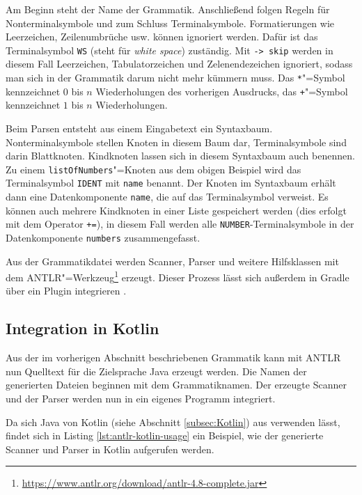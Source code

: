 Am Beginn steht der Name der Grammatik. Anschließend folgen Regeln für Nonterminalsymbole und zum Schluss Terminalsymbole. Formatierungen wie Leerzeichen, Zeilenumbrüche usw. können ignoriert werden. Dafür ist das Terminalsymbol \lstinline{WS} (steht für \emph{white space}) zuständig. Mit \lstinline{-> skip} werden in diesem Fall Leerzeichen, Tabulatorzeichen und Zelenendezeichen ignoriert, sodass man sich in der Grammatik darum nicht mehr kümmern muss. Das \lstinline{*}"=Symbol kennzeichnet $0$ bis $n$ Wiederholungen des vorherigen Ausdrucks, das \lstinline{+}"=Symbol kennzeichnet $1$ bis $n$ Wiederholungen.

Beim Parsen entsteht aus einem Eingabetext ein Syntaxbaum. Nonterminalsymbole stellen Knoten in diesem Baum dar, Terminalsymbole sind darin Blattknoten. Kindknoten lassen sich in diesem Syntaxbaum auch benennen. Zu einem \lstinline{listOfNumbers}"=Knoten aus dem obigen Beispiel wird das Terminalsymbol \lstinline{IDENT} mit \lstinline{name} benannt. Der Knoten im Syntaxbaum erhält dann eine Datenkomponente \lstinline{name}, die auf das Terminalsymbol verweist. Es können auch mehrere Kindknoten in einer Liste gespeichert werden (dies erfolgt mit dem Operator \lstinline{+=}), in diesem Fall werden alle \lstinline{NUMBER}-Terminalsymbole in der Datenkomponente \lstinline{numbers} zusammengefasst.

Aus der Grammatikdatei werden Scanner, Parser und weitere Hilfsklassen mit dem ANTLR"=Werkzeug\footnote{\url{https://www.antlr.org/download/antlr-4.8-complete.jar}} erzeugt. Dieser Prozess lässt sich außerdem in Gradle über ein Plugin integrieren \cite{GradleANTLRPlugin}.

\subsection{Integration in Kotlin}

Aus der im vorherigen Abschnitt beschriebenen Grammatik kann mit ANTLR nun Quelltext für die Zielsprache Java erzeugt werden. Die Namen der generierten Dateien beginnen mit dem Grammatiknamen. Der erzeugte Scanner und der Parser werden nun in ein eigenes Programm integriert.

Da sich Java von Kotlin (siehe Abschnitt \ref{subsec:Kotlin}) aus verwenden lässt, findet sich in Listing \ref{lst:antlr-kotlin-usage} ein Beispiel, wie der generierte Scanner und Parser in Kotlin aufgerufen werden. 



